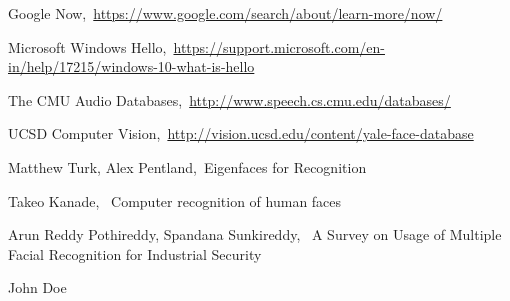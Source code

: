 \documentclass[conference]{IEEEtran}
\begin{document}
%
%
%
\begin{thebibliography}{99}

 Google Now,\ \url{https://www.google.com/search/about/learn-more/now/}

 Microsoft Windows Hello,\ \url{https://support.microsoft.com/en-in/help/17215/windows-10-what-is-hello}

 The CMU Audio Databases,\ \url{http://www.speech.cs.cmu.edu/databases/}

 UCSD Computer Vision,\ \url{http://vision.ucsd.edu/content/yale-face-database}

 Matthew Turk, Alex Pentland,\ {Eigenfaces for Recognition}

 Takeo Kanade, \ {Computer recognition of human faces}

 Arun Reddy Pothireddy, Spandana Sunkireddy, \ {A Survey on Usage of Multiple Facial Recognition for Industrial Security}

\end{thebibliography}

%

\begin{IEEEbiography}{John Doe}
\blindtext
\end{IEEEbiography}







\end{document}
